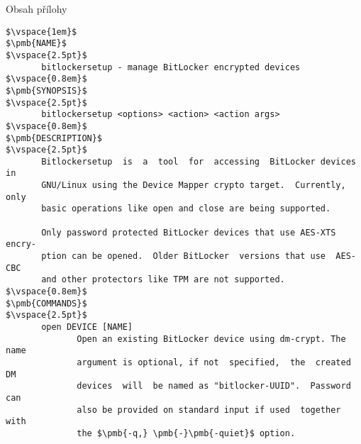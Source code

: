 
\listofappendices

\label{attachment:metadata}
Obsah přílohy

\label{attachment:manpage}


\begin{lstlisting}[frame=none, escapechar=$, columns=fullflexible, keepspaces=true, basicstyle=\ttfamily\small]
$\vspace{1em}$
$\pmb{NAME}$
$\vspace{2.5pt}$
       bitlockersetup - manage BitLocker encrypted devices
$\vspace{0.8em}$
$\pmb{SYNOPSIS}$
$\vspace{2.5pt}$
       bitlockersetup <options> <action> <action args>
$\vspace{0.8em}$
$\pmb{DESCRIPTION}$
$\vspace{2.5pt}$
       Bitlockersetup  is  a  tool  for  accessing  BitLocker devices in
       GNU/Linux using the Device Mapper crypto target.  Currently, only
       basic operations like open and close are being supported.

       Only password protected BitLocker devices that use AES-XTS encry-
       ption can be opened.  Older BitLocker  versions that use  AES-CBC
       and other protectors like TPM are not supported.
$\vspace{0.8em}$
$\pmb{COMMANDS}$
$\vspace{2.5pt}$
       open DEVICE [NAME]
              Open an existing BitLocker device using dm-crypt. The name
              argument is optional, if not  specified,  the  created  DM
              devices  will  be named as "bitlocker-UUID".  Password can
              also be provided on standard input if used  together  with
              the $\pmb{-q,} \pmb{-}\pmb{-quiet}$ option.


\end{lstlisting}

